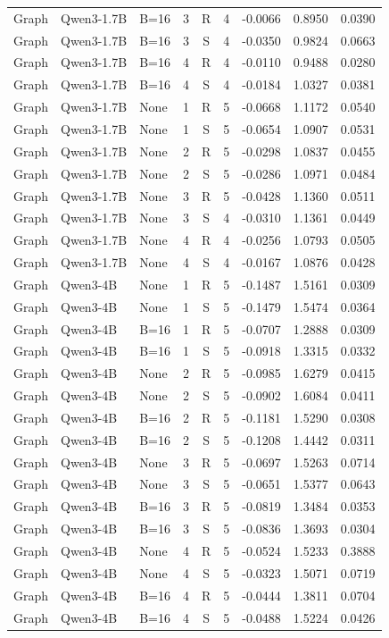 \begin{table}[H]
\begin{tabular}{@{}lllcccccc@{}}
Graph & Qwen3-1.7B & B=16 & 3 & R & 4 & -0.0066 & 0.8950 & 0.0390\\
Graph & Qwen3-1.7B & B=16 & 3 & S & 4 & -0.0350 & 0.9824 & 0.0663\\
Graph & Qwen3-1.7B & B=16 & 4 & R & 4 & -0.0110 & 0.9488 & 0.0280\\
Graph & Qwen3-1.7B & B=16 & 4 & S & 4 & -0.0184 & 1.0327 & 0.0381\\
Graph & Qwen3-1.7B & None & 1 & R & 5 & -0.0668 & 1.1172 & 0.0540\\
Graph & Qwen3-1.7B & None & 1 & S & 5 & -0.0654 & 1.0907 & 0.0531\\
Graph & Qwen3-1.7B & None & 2 & R & 5 & -0.0298 & 1.0837 & 0.0455\\
Graph & Qwen3-1.7B & None & 2 & S & 5 & -0.0286 & 1.0971 & 0.0484\\
Graph & Qwen3-1.7B & None & 3 & R & 5 & -0.0428 & 1.1360 & 0.0511\\
Graph & Qwen3-1.7B & None & 3 & S & 4 & -0.0310 & 1.1361 & 0.0449\\
Graph & Qwen3-1.7B & None & 4 & R & 4 & -0.0256 & 1.0793 & 0.0505\\
Graph & Qwen3-1.7B & None & 4 & S & 4 & -0.0167 & 1.0876 & 0.0428\\
\addlinespace
Graph & Qwen3-4B & None & 1 & R & 5 & -0.1487 & 1.5161 & 0.0309\\
Graph & Qwen3-4B & None & 1 & S & 5 & -0.1479 & 1.5474 & 0.0364\\
Graph & Qwen3-4B & B=16 & 1 & R & 5 & -0.0707 & 1.2888 & 0.0309\\
Graph & Qwen3-4B & B=16 & 1 & S & 5 & -0.0918 & 1.3315 & 0.0332\\
Graph & Qwen3-4B & None & 2 & R & 5 & -0.0985 & 1.6279 & 0.0415\\
Graph & Qwen3-4B & None & 2 & S & 5 & -0.0902 & 1.6084 & 0.0411\\
Graph & Qwen3-4B & B=16 & 2 & R & 5 & -0.1181 & 1.5290 & 0.0308\\
Graph & Qwen3-4B & B=16 & 2 & S & 5 & -0.1208 & 1.4442 & 0.0311\\
Graph & Qwen3-4B & None & 3 & R & 5 & -0.0697 & 1.5263 & 0.0714\\
Graph & Qwen3-4B & None & 3 & S & 5 & -0.0651 & 1.5377 & 0.0643\\
Graph & Qwen3-4B & B=16 & 3 & R & 5 & -0.0819 & 1.3484 & 0.0353\\
Graph & Qwen3-4B & B=16 & 3 & S & 5 & -0.0836 & 1.3693 & 0.0304\\
Graph & Qwen3-4B & None & 4 & R & 5 & -0.0524 & 1.5233 & 0.3888\\
Graph & Qwen3-4B & None & 4 & S & 5 & -0.0323 & 1.5071 & 0.0719\\
Graph & Qwen3-4B & B=16 & 4 & R & 5 & -0.0444 & 1.3811 & 0.0704\\
Graph & Qwen3-4B & B=16 & 4 & S & 5 & -0.0488 & 1.5224 & 0.0426\\
\bottomrule
\end{tabular}
\end{table}
